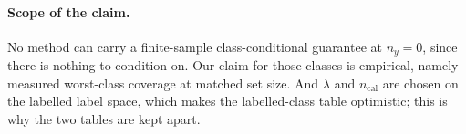 \paragraph{Scope of the claim.} No method can carry a finite-sample class-conditional
guarantee at $n_y=0$, since there is nothing to condition on. Our claim for those classes is
empirical, namely measured worst-class coverage at matched set size. And $\lambda$ and
$n_{\mathrm{cal}}$ are chosen on the labelled label space, which makes the labelled-class
table optimistic; this is why the two tables are kept apart.
